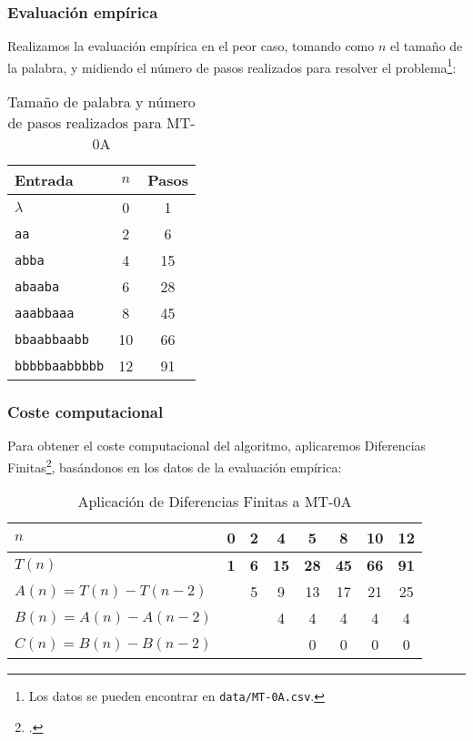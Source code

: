\subsubsection*{Evaluación empírica}
Realizamos la evaluación empírica en el peor caso, tomando como $n$ el tamaño de la palabra, y midiendo el número de pasos realizados para resolver el problema\footnote{Los datos se pueden encontrar en \texttt{data/MT-0A.csv}.}:

\begin{table}[h]
    \centering
    \begin{tabular}{lcc}
        Entrada & $n$ & Pasos \\
        \hline
        $\lambda$               & 0  & 1  \\
        \texttt{aa}             & 2  & 6  \\
        \texttt{abba}           & 4  & 15 \\
        \texttt{abaaba}         & 6  & 28 \\
        \texttt{aaabbaaa}       & 8  & 45 \\
        \texttt{bbaabbaabb}     & 10 & 66 \\
        \texttt{bbbbbaabbbbb}   & 12 & 91
    \end{tabular}
    \caption{Tamaño de palabra y número de pasos realizados para MT-0A}
\end{table}


\subsubsection*{Coste computacional}
Para obtener el coste computacional del algoritmo, aplicaremos Diferencias Finitas\footcite[ver][pgs. 1-42: \textit{Chapter 1. Difference Tables and Polynomial Fits}]{cuoco2005mathematical}\label{dfref}, basándonos en los datos de la evaluación empírica:

\begin{table}[H]
    \centering
    \begin{tabular}{|l|c|c|c|c|c|c|c|}
        \hline
        $n$ & \textbf{0} & \textbf{2} & \textbf{4} & \textbf{5} & \textbf{8} & \textbf{10} & \textbf{12} \\ \hline
        $T(n)$ & \textbf{1} & \textbf{6} & \textbf{15} & \textbf{28} & \textbf{45} & \textbf{66} & \textbf{91} \\ \hline
        \hline
        $A(n) = T(n) - T(n-2)$ &    &  5 &  9 & 13 & 17 & 21 & 25 \\ \hline
        $B(n) = A(n) - A(n-2)$ &    &    &  4 &  4 &  4 &  4 &  4 \\ \hline
        $C(n) = B(n) - B(n-2)$ &    &    &    &  0 &  0 &  0 &  0 \\ \hline
    \end{tabular}
    \label{tab:0A}
    \caption{Aplicación de Diferencias Finitas a MT-0A}
\end{table}

